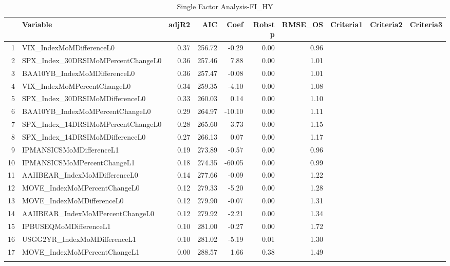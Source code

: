 \begin{longtable}{rlrrrrrlll}
  \hline
 & Variable & adjR2 & AIC & Coef & Robst p & RMSE\_OS & Criteria1 & Criteria2 & Criteria3 \\ 
  \hline
1 & VIX\_IndexMoMDifferenceL0 & 0.37 & 256.72 & -0.29 & 0.00 & 0.96 &  &  &  \\ 
  2 & SPX\_Index\_30DRSIMoMPercentChangeL0 & 0.36 & 257.46 & 7.88 & 0.00 & 1.01 &  &  &  \\ 
  3 & BAA10YB\_IndexMoMDifferenceL0 & 0.36 & 257.47 & -0.08 & 0.00 & 1.01 &  &  &  \\ 
  4 & VIX\_IndexMoMPercentChangeL0 & 0.34 & 259.35 & -4.10 & 0.00 & 1.08 &  &  &  \\ 
  5 & SPX\_Index\_30DRSIMoMDifferenceL0 & 0.33 & 260.03 & 0.14 & 0.00 & 1.10 &  &  &  \\ 
  6 & BAA10YB\_IndexMoMPercentChangeL0 & 0.29 & 264.97 & -10.10 & 0.00 & 1.11 &  &  &  \\ 
  7 & SPX\_Index\_14DRSIMoMPercentChangeL0 & 0.28 & 265.60 & 3.73 & 0.00 & 1.15 &  &  &  \\ 
  8 & SPX\_Index\_14DRSIMoMDifferenceL0 & 0.27 & 266.13 & 0.07 & 0.00 & 1.17 &  &  &  \\ 
  9 & IPMANSICSMoMDifferenceL1 & 0.19 & 273.89 & -0.57 & 0.00 & 0.96 &  &  &  \\ 
  10 & IPMANSICSMoMPercentChangeL1 & 0.18 & 274.35 & -60.05 & 0.00 & 0.99 &  &  &  \\ 
  11 & AAIIBEAR\_IndexMoMDifferenceL0 & 0.14 & 277.66 & -0.09 & 0.00 & 1.22 &  &  &  \\ 
  12 & MOVE\_IndexMoMPercentChangeL0 & 0.12 & 279.33 & -5.20 & 0.00 & 1.28 &  &  &  \\ 
  13 & MOVE\_IndexMoMDifferenceL0 & 0.12 & 279.90 & -0.07 & 0.00 & 1.31 &  &  &  \\ 
  14 & AAIIBEAR\_IndexMoMPercentChangeL0 & 0.12 & 279.92 & -2.21 & 0.00 & 1.34 &  &  &  \\ 
  15 & IPBUSEQMoMDifferenceL1 & 0.10 & 281.00 & -0.27 & 0.00 & 1.72 &  &  &  \\ 
  16 & USGG2YR\_IndexMoMDifferenceL1 & 0.10 & 281.02 & -5.19 & 0.01 & 1.30 &  &  &  \\ 
  17 & MOVE\_IndexMoMPercentChangeL1 & 0.00 & 288.57 & 1.66 & 0.38 & 1.49 &  &  &  \\ 
   \hline
\hline
\caption{Single Factor Analysis-FI_HY} 
\end{longtable}
